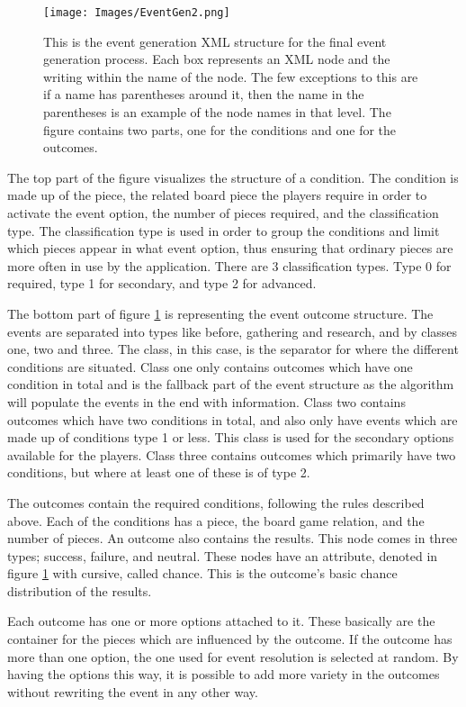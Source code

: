 \begin{figure}[!ht]
    \centering
    \texttt{[image: Images/EventGen2.png]}
    \caption{This is the event generation XML structure for the final event generation process. Each box represents an XML node and the writing within the name of the node. The few exceptions to this are if a name has parentheses around it, then the name in the parentheses is an example of the node names in that level. The figure contains two parts, one for the conditions and one for the outcomes.}
    \label{fig:eGen2}
\end{figure}

The top part of the figure visualizes the structure of a condition. The condition is made up of the piece, the related board piece the players require in order to activate the event option, the number of pieces required, and the classification type.
The classification type is used in order to group the conditions and limit which pieces appear in what event option, thus ensuring that ordinary pieces are more often in use by the application. There are 3 classification types. Type 0 for required, type 1 for secondary, and type 2 for advanced.

The bottom part of figure \ref{fig:eGen2} is representing the event outcome structure. The events are separated into types like before, gathering and research, and by classes one, two and three. 
The class, in this case, is the separator for where the different conditions are situated. Class one only contains outcomes which have one condition in total and is the fallback part of the event structure as the algorithm will populate the events in the end with information.
Class two contains outcomes which have two conditions in total, and also only have events which are made up of conditions type 1 or less. 
This class is used for the secondary options available for the players.
Class three contains outcomes which primarily have two conditions, but where at least one of these is of type 2.

The outcomes contain the required conditions, following the rules described above. Each of the conditions has a piece, the board game relation, and the number of pieces. 
An outcome also contains the results. This node comes in three types; success, failure, and neutral. These nodes have an attribute, denoted in figure \ref{fig:eGen2} with cursive, called chance. This is the outcome's basic chance distribution of the results. 

Each outcome has one or more options attached to it. These basically are the container for the pieces which are influenced by the outcome. If the outcome has more than one option, the one used for event resolution is selected at random. 
By having the options this way, it is possible to add more variety in the outcomes without rewriting the event in any other way.

